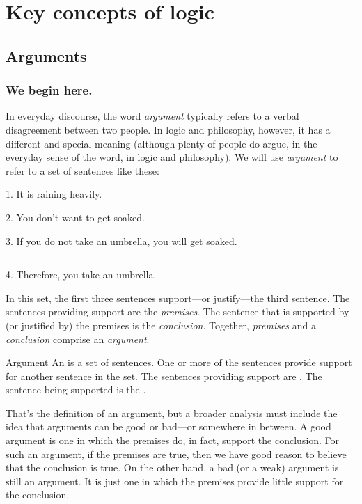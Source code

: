 \part{Key concepts of logic}
\label{ch.intro}


\chapter{Arguments}
\label{s:Arguments}

\section{We begin here.}

In everyday discourse, the word \textit{argument} typically refers to a verbal disagreement between two people. In logic and philosophy, however, it has a different and special meaning (although plenty of people do argue, in the everyday sense of the word, in logic and philosophy). We will use \textit{argument} to refer to a set of sentences like these:
	\begin{earg}\label{argRaining}
		\item[1.] It is raining heavily. 
		\item[2.] You don't want to get soaked.
		\item[3.] If you do not take an umbrella, you will get soaked.
		      \vspace{0.1cm}
     			\hrule
      			\vspace{0.12cm}
		\item[4.] Therefore, you take an umbrella.
	\end{earg}
In this set, the first three sentences support---or justify---the third sentence. The sentences providing support are the \emph{premises}. The sentence that is supported by (or justified by) the premises is the \emph{conclusion}. Together, \textit{premises} and a \textit{conclusion} comprise an \textit{argument}.  

\begin{factboxy}{Argument}
An  is a set of sentences. One or more of the sentences provide support for another sentence in the set. The sentences providing support are . The sentence being supported is the .
\end{factboxy}

That's the definition of an argument, but a broader analysis must include the idea that arguments can be good or bad---or  somewhere in between. A good argument is one in which the premises do, in fact, support the conclusion. For such an argument, if the premises are true, then we have good reason to believe that the conclusion is true. On the other hand, a bad (or a weak) argument is still an argument. It is just one in which the premises provide little support for the conclusion.

